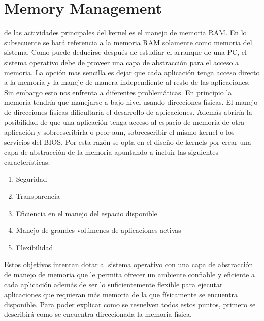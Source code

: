 \section{Memory Management} 
 de las actividades principales del kernel es el manejo de memoria RAM. En
lo subsecuente se hará referencia a la memoria RAM solamente como memoria del
sistema. Como puede deducirse después de estudiar el arranque de una PC, el
sistema operativo debe de proveer una capa de abstracción para el acceso a
memoria. La opción mas sencilla es dejar que cada aplicación tenga acceso
directo a la memoria y la maneje de manera independiente al resto de las
aplicaciones. Sin embargo esto nos enfrenta a diferentes problemáticas. En
principio la memoria tendría que manejarse a bajo nivel usando direcciones
físicas. El manejo de direcciones físicas dificultaría el desarrollo de
aplicaciones. Además abriría la posibilidad de que una aplicación tenga acceso
al espacio de memoria de otra aplicación y sobreescribirla o peor aun,
sobreescribir el mismo kernel o los servicios del BIOS.  Por esta razón se opta
en el diseño de kernels por crear una capa de abstracción de la memoria
apuntando a incluir las siguientes características:
\begin{enumerate}
    \item Seguridad
    \item Transparencia
    \item Eficiencia en el manejo del espacio disponible
    \item Manejo de grandes volúmenes de aplicaciones activas
    \item Flexibilidad
\end{enumerate} Estos objetivos intentan dotar al sistema operativo con una
capa de abstracción de manejo de memoria que le permita ofrecer un ambiente
confiable y eficiente a cada aplicación además de ser lo suficientemente
flexible para ejecutar aplicaciones que requieran más memoria de la que
físicamente se encuentra disponible. Para poder explicar como se resuelven
todos estos puntos, primero se describirá como se encuentra direccionada la
memoria física.

